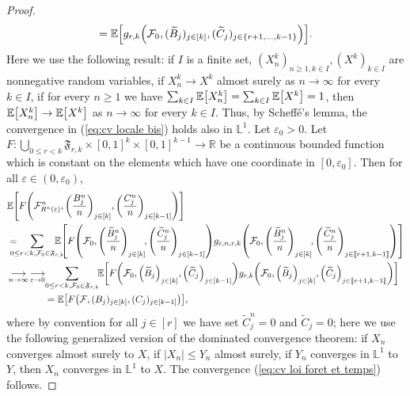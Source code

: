 \documentclass[11pt]{article}
\theoremstyle{plain}
\theoremstyle{definition}
\theoremstyle{remark}
\newcommand{\R}{\mathbb{R}} %
\newcommand{\E}{\mathbb{E}} %
\newcommand{\Lp}{\mathbb{L}} %
\newcommand{\1}{\mathbbm{1}} %
\newcommand{\esp}[1]{\mathbb{E}\left[#1\right]} %
\newcommand{\e}{\varepsilon} %
\let\originalleft\left
\let\originalright\right
\renewcommand{\left}{\mathopen{}\mathclose\bgroup\originalleft}
\renewcommand{\right}{\aftergroup\egroup\originalright}
\begin{document}
\begin{proof}
\[=
\E\left[ g_{r,k}\left(\mathcal{F}_0, (\widetilde{B}_j)_{j\in [k]}, (\widetilde{C}_j)_{j \in \{r+1,\ldots, k-1 \}}\right) \right].
\]
{Here we use the following result: if $I$ is a finite set,  $(X_{n}^{k})_{n \geq 1, k \in I},(X^k)_{k \in I}$ are nonnegative random variables, if $X_{n}^{k} \rightarrow X^{k}$ almost surely as $n \rightarrow \infty$ for every $k \in I$, if for every $n \geq 1$ we have $\sum_{k \in I} \esp{X_{n}^{k}}=\sum_{k \in I} \esp{X^{k}}=1$, then $\esp{X_{n}^{k}} \rightarrow \esp{X^{k}}$ as $n \rightarrow \infty$ for every $k\in I$.} 
Thus, by Scheffé's lemma, the convergence in (\ref{eq:cv locale bis}) holds also in $\Lp^1$.
Let $\e_0>0$. Let $F: \bigcup_{0\le r<k} \mathfrak{F}_{r,k} \times [0,1]^k \times [0,1]^{k-1} \to \R$ be a continuous bounded function which is constant on the elements which have one coordinate in $[0,\e_0]$. Then for all $\e \in (0,\e_0)$,
\begin{align*}
	&\E\left[ F \left(\mathcal{F}^n_{R^n(\e)}, \left(\frac{B^n_j}{n}\right)_{j \in [k]}, \left(\frac{{C}^n_j}{n}\right)_{j \in [k-1]}
	\right)\right] \\
	&=  \! \! \!  \! \! \! \sum_{0\le r <k, \mathcal{F}_0\in \mathfrak{F}_{r,k}} \! \! \! \! \! \! \!
	 \E\left[
	F \left(\mathcal{F}_0, \left(\frac{\widetilde{B}^n_j}{n}\right)_{j \in [k]} \! , \left(\frac{\widetilde{C}^n_j}{n}\right)_{j \in [k-1]}
	\right)
	g_{\e, n, r, k}\left(\mathcal{F}_0, \left(\frac{\widetilde{B}^n_j}{n}\right)_{j \in [k]} \! , \left(\frac{\widetilde{C}^n_j}{n}\right)_{j \in \llbracket r+1, k-1 \rrbracket}
	\right)
	\right] \\
	&\mathop{\longrightarrow} \limits_{n \to \infty} \mathop{\longrightarrow} \limits_{\e \to 0}
	\!  \sum_{0\le r <k, \mathcal{F}_0\in \mathfrak{F}_{r,k}} \! \!	\E\left[
	F \left(\mathcal{F}_0, \left(\widetilde{B}_j \right)_{j \in [k]}  , \left( \widetilde{C}_j \right)_{j \in [k-1]}
	\right)
	g_{r, k}\left(\mathcal{F}_0, \left(\widetilde{B}_j\right)_{j \in [k]} , \left({\widetilde{C}_j}\right)_{j \in \llbracket r+1, k-1 \rrbracket}
	\right)
	\right] \\
	&   \qquad \qquad= \E \left[
	F\left(
	\mathcal{F}, (B_j)_{j \in [k]}, (C_j)_{j\in [k-1]}
	\right)
	\right],
\end{align*}
where by convention for all $j \in [r]$ we have set $\widetilde{C}^n_j=0$ and $\widetilde{C}_j=0$;
{here we use the following generalized version of the dominated convergence theorem: if $X_{n}$ converges almost surely to $X$, if $|X_{n}| \leq Y_{n}$ almost surely, if $Y_{n}$ converges in $\Lp^{1}$ to $Y$, then $X_{n}$ converges in $\Lp^{1}$ to $X$.} 
The convergence  (\ref{eq:cv loi foret et temps}) follows.


\end{proof}
\end{document}
